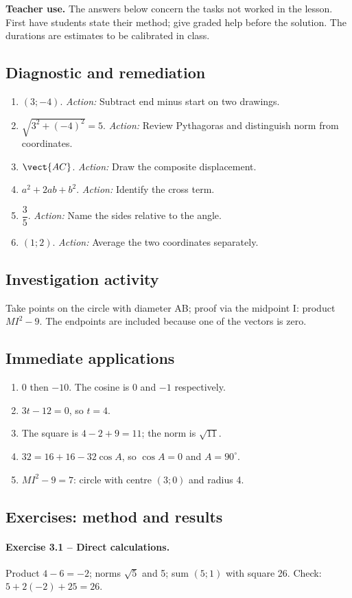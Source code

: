 \label{C03-CORR}
\textbf{Teacher use.} The answers below concern the tasks not worked in the lesson. First have students state their method; give graded help before the solution. The durations are estimates to be calibrated in class.
\subsection*{Diagnostic and remediation}
\begin{enumerate}
\item $(3;-4)$. \textit{Action:} Subtract end minus start on two drawings.
\item $\sqrt{3^2+(-4)^2}=5$. \textit{Action:} Review Pythagoras and distinguish norm from coordinates.
\item $\vect{AC}$. \textit{Action:} Draw the composite displacement.
\item $a^2+2ab+b^2$. \textit{Action:} Identify the cross term.
\item $\dfrac{3}{5}$. \textit{Action:} Name the sides relative to the angle.
\item $(1;2)$. \textit{Action:} Average the two coordinates separately.
\end{enumerate}
\subsection*{Investigation activity}
Take points on the circle with diameter AB; proof via the midpoint I: product $MI^2-9$. The endpoints are included because one of the vectors is zero.
\subsection*{Immediate applications}
\begin{enumerate}
\item $0$ then $-10$. The cosine is 0 and $-1$ respectively.
\item $3t-12=0$, so $t=4$.
\item The square is $4-2+9=11$; the norm is $\sqrt{11}$.
\item $32=16+16-32\cos A$, so $\cos A=0$ and $A=90^\circ$.
\item $MI^2-9=7$: circle with centre $(3;0)$ and radius 4.
\end{enumerate}
\subsection*{Exercises: method and results}
\paragraph{Exercise 3.1 -- Direct calculations.} Product $4-6=-2$; norms $\sqrt5$ and 5; sum $(5;1)$ with square 26. Check: $5+2(-2)+25=26$.
